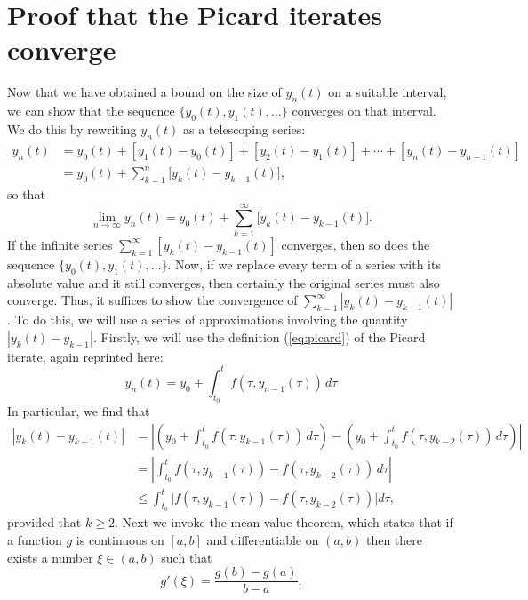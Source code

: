 \documentclass{myart}
\newcommand{\eq}[1]{(\ref{eq:#1})}
\begin{document}
\section{Proof that the Picard iterates converge}

Now that we have obtained a bound on the size of $y_n(t)$ on a
suitable interval, we can show that the sequence $\{y_0(t), y_1(t),
\ldots\}$ converges on that interval. We do this by rewriting $y_n(t)$
as a telescoping series:
\begin{align*}
y_n(t) &= y_0(t) + [y_1(t) - y_0(t)] + [y_2(t) - y_1(t)]
                 + \cdots + [y_n(t) - y_{n-1}(t)] \\
       &= y_0(t) + \sum_{k=1}^n \Big[y_k(t) - y_{k-1}(t)\Big],
\end{align*}
so that
\begin{equation*}
  \lim_{n \to \infty} y_n(t)
= y_0(t) + \sum_{k=1}^\infty \Big[y_k(t) - y_{k-1}(t)\Big].
\end{equation*}
If the infinite series $\sum_{k=1}^\infty [y_k(t) - y_{k-1}(t)]$
converges, then so does the sequence $\{y_0(t), y_1(t), \ldots\}$.
Now, if we replace every term of a series with its absolute value and
it still converges, then certainly the original series must also
converge. Thus, it suffices to show the convergence of
$\sum_{k=1}^\infty |y_k(t) - y_{k-1}(t)|$. To do this, we will use a
series of approximations involving the quantity $|y_k(t) - y_{k-1}|$.
Firstly, we will use the definition \eq{picard} of the Picard iterate,
again reprinted here:
\begin{equation*}
y_n(t) = y_0 + \int_{t_0}^t f(\tau, y_{n-1}(\tau)) \,d\tau
\end{equation*}
In particular, we find that
\begin{align*}
   |y_k(t) - y_{k-1}(t)|
&= \left|\left(y_0 + \int_{t_0}^t f(\tau, y_{k-1}(\tau)) \,d\tau\right)
   - \left(y_0 + \int_{t_0}^t f(\tau, y_{k-2}(\tau))
       \,d\tau\right)\right| \\
&= \left|\int_{t_0}^t f(\tau, y_{k-1}(\tau))
     - f(\tau, y_{k-2}(\tau)) \,d\tau\right| \\
&\leq \int_{t_0}^t \Big|f(\tau, y_{k-1}(\tau))
        - f(\tau, y_{k-2}(\tau))\Big| d\tau,
\end{align*}
provided that $k \geq 2$. Next we invoke the mean value theorem, which
states that if a function $g$ is continuous on $[a, b]$ and
differentiable on $(a, b)$ then there exists a number $\xi \in (a, b)$
such that
\begin{equation*}
g'(\xi) = \frac{g(b) - g(a)}{b - a}.
\end{equation*}
\end{document}
